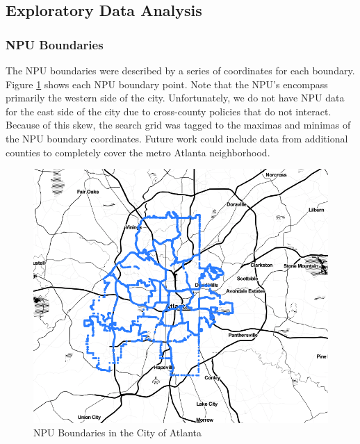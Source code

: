 \documentclass[11pt]{amsart}
\begin{document}
\subsection{Exploratory Data Analysis}
\subsubsection{NPU Boundaries}
The NPU boundaries were described by a series of coordinates for each boundary. Figure \ref{fig:npuoutlines} shows each NPU boundary point. Note that the NPU's encompass primarily the western side of the city. Unfortunately, we do not have NPU data for the east side of the city due to cross-county policies that do not interact. Because of this skew, the search grid was tagged to the maximas and minimas of the NPU boundary coordinates. Future work could include data from additional counties to completely cover the metro Atlanta neighborhood. 
\begin{figure}[h]
\includegraphics[width=\textwidth]{NPUoutlines.png}
\caption{NPU Boundaries in the City of Atlanta}
\label{fig:npuoutlines}
\end{figure}
\end{document}
